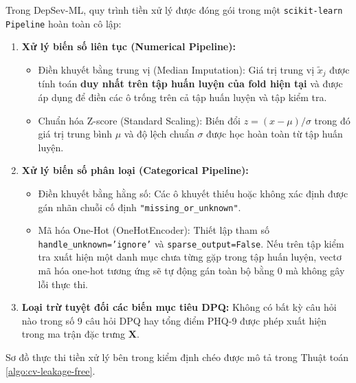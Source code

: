 Trong DepSev-ML, quy trình tiền xử lý được đóng gói trong một \texttt{scikit-learn Pipeline} hoàn toàn cô lập:
\begin{enumerate}
    \item \textbf{Xử lý biến số liên tục (Numerical Pipeline):}
    \begin{itemize}
        \item Điền khuyết bằng trung vị (Median Imputation): Giá trị trung vị $\tilde{x}_j$ được tính toán \textbf{duy nhất trên tập huấn luyện của fold hiện tại} và được áp dụng để điền các ô trống trên cả tập huấn luyện và tập kiểm tra.
        \item Chuẩn hóa Z-score (Standard Scaling): Biến đổi $z = (x - \mu) / \sigma$ trong đó giá trị trung bình $\mu$ và độ lệch chuẩn $\sigma$ được học hoàn toàn từ tập huấn luyện.
    \end{itemize}
    \item \textbf{Xử lý biến số phân loại (Categorical Pipeline):}
    \begin{itemize}
        \item Điền khuyết bằng hằng số: Các ô khuyết thiếu hoặc không xác định được gán nhãn chuỗi cố định \texttt{"missing\_or\_unknown"}.
        \item Mã hóa One-Hot (OneHotEncoder): Thiết lập tham số \texttt{handle\_unknown='ignore'} và \texttt{sparse\_output=False}. Nếu trên tập kiểm tra xuất hiện một danh mục chưa từng gặp trong tập huấn luyện, vectơ mã hóa one-hot tương ứng sẽ tự động gán toàn bộ bằng 0 mà không gây lỗi thực thi.
    \end{itemize}
    \item \textbf{Loại trừ tuyệt đối các biến mục tiêu DPQ:} Không có bất kỳ câu hỏi nào trong số 9 câu hỏi DPQ hay tổng điểm PHQ-9 được phép xuất hiện trong ma trận đặc trưng $\mathbf{X}$.
\end{enumerate}

Sơ đồ thực thi tiền xử lý bên trong kiểm định chéo được mô tả trong Thuật toán \ref{algo:cv-leakage-free}.

